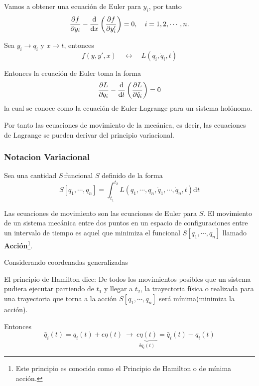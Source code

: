 \documentclass[../main]{subfiles}
\begin{document}
Vamos a obtener una ecuación de Euler para $y_i$, por tanto
\begin{equation}
    \pdv{f}{y_i}-\dv{}{x}\left(\pdv{f}{y'_i}\right)=0,\quad i=1,2,\cdots, n.
\end{equation}

Sea $y_i\rightarrow q_i$ y $x \rightarrow t$, entonces
\begin{equation}
    f(y,y',x)\quad \leftrightarrow \quad L(q_i, \dot{q}_i, t)
\end{equation}

Entonces la ecuación de Euler toma la forma
\begin{equation}
    \pdv{L}{q_i}-\dv{}{t}\left(\pdv{L}{\dot{q}_i}\right)=0
\end{equation}
la cual se conoce como la ecuación de Euler-Lagrange para un sistema holónomo.

Por tanto las ecuaciones de movimiento de la mecánica, es decir, las ecuaciones de Lagrange se pueden derivar del principio variacional.

\subsubsection{Notacion Variacional}
Sea una cantidad $S$:funcional $S$ definido de la forma
\begin{equation}
    S[q_1, \cdots, q_n]=\int_{t_1}^{t_2} L(q_1, \cdots, q_n, \dot{q}_1, \cdots, \dot{q}_n, t)\mathrm{d}t
\end{equation}

Las ecuaciones de movimiento son las ecuaciones de Euler para $S$. El movimiento de un sistema mecánica entre dos puntos en un espacio de configuraciones entre un intervalo de tiempo es aquel que minimiza el funcional $S[q_1, \cdots, q_n]$ llamado \textbf{Acción}\footnote{Este principio es conocido como el Principio de Hamilton o de mínima acción.}.

Considerando coordenadas generalizadas

El principio de Hamilton dice: De todos los movimientos posibles que un sistema pudiera ejecutar partiendo de $t_1$ y llegar a $t_2$, la trayectoria física o realizada para una trayectoria que torna a la acción $S[q_1, \cdots, q_n]$ será mínima(minimiza la acción).

Entonces
\begin{equation}
    \bar{q}_i(t)=q_i (t)+\epsilon \eta(t) \ \rightarrow \ \underbrace{\epsilon\eta (t)}_{\delta q_i(t)}=\bar{q}_i(t)-q_i(t)
\end{equation}
\end{document}
